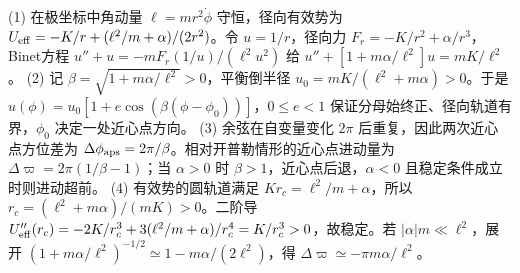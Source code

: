 (1) 在极坐标中角动量 \(\ell=mr^2\dot\phi\) 守恒，径向有效势为 \(U_{\rm eff}=-K/r+(\ell^2/m+\alpha)/(2r^2)\)。令 \(u=1/r\)，径向力 \(F_r=-K/r^2+\alpha/r^3\)，Binet方程 \(u''+u=-mF_r(1/u)/(\ell^2u^2)\) 给 \(u''+[1+m\alpha/\ell^2]u=mK/\ell^2\)。
(2) 记 \(\beta=\sqrt{1+m\alpha/\ell^2}>0\)，平衡倒半径 \(u_0=mK/(\ell^2+m\alpha)>0\)。于是 \(u(\phi)=u_0[1+e\cos(\beta(\phi-\phi_0))]\)，\(0\le e<1\) 保证分母始终正、径向轨道有界，\(\phi_0\) 决定一处近心点方向。
(3) 余弦在自变量变化 \(2\pi\) 后重复，因此两次近心点方位差为 \(\Delta\phi_{\rm aps}=2\pi/\beta\)。相对开普勒情形的近心点进动量为 \(\Delta\varpi=2\pi(1/\beta-1)\)；当 \(\alpha>0\) 时 \(\beta>1\)，近心点后退，\(\alpha<0\) 且稳定条件成立时则进动超前。
(4) 有效势的圆轨道满足 \(Kr_c=\ell^2/m+\alpha\)，所以 \(r_c=(\ell^2+m\alpha)/(mK)>0\)。二阶导 \(U_{\rm eff}''(r_c)=-2K/r_c^3+3(\ell^2/m+\alpha)/r_c^4=K/r_c^3>0\)，故稳定。若 \(|\alpha|m\ll\ell^2\)，展开 \((1+m\alpha/\ell^2)^{-1/2}\simeq1-m\alpha/(2\ell^2)\)，得 \(\Delta\varpi\simeq-\pi m\alpha/\ell^2\)。
